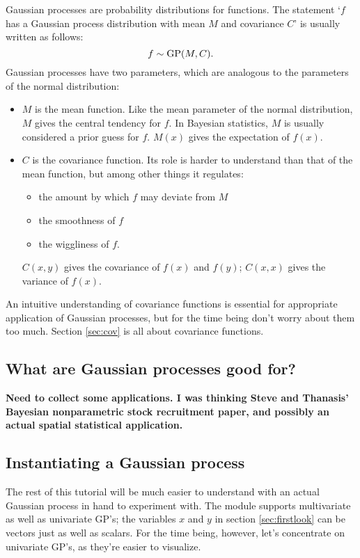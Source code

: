 \documentclass{manual}
\begin{document}
Gaussian processes are probability distributions for functions. The statement `$f$ has a Gaussian process distribution with mean $M$ and covariance $C$' is usually written as follows:
\begin{equation}
    f\sim\textup{GP}(M,C).
\end{equation}
Gaussian processes have two parameters, which are analogous to the parameters of the normal distribution:
\begin{itemize}
    \item $M$ is the mean function. Like the mean parameter of the normal distribution, $M$ gives the central tendency for $f$. In Bayesian statistics, $M$ is usually considered a prior guess for $f$. $M(x)$ gives the expectation of $f(x)$.
    \item $C$  is the covariance function. Its role is harder to understand than that of the mean function, but among other things it regulates:
    \begin{itemize}
        \item the amount by which $f$ may deviate from $M$
        \item the smoothness of $f$
        \item the wiggliness of $f$.
    \end{itemize}
    $C(x,y)$ gives the covariance of $f(x)$ and $f(y)$; $C(x,x)$ gives the variance of $f(x)$.
\end{itemize}
An intuitive understanding of covariance functions is essential for appropriate application of Gaussian processes, but for the time being don't worry about them too much. Section \ref{sec:cov} is all about covariance functions.


\subsection{What are Gaussian processes good for?}\label{sub:applications}
\textbf{Need to collect some applications. I was thinking Steve and Thanasis' Bayesian nonparametric stock recruitment paper, and possibly an actual spatial statistical application.}

\subsection{Instantiating a Gaussian process}\label{sub:inst}

The rest of this tutorial will be much easier to understand with an actual Gaussian process in hand to experiment with. The  module supports multivariate as well as univariate GP's; the variables $x$ and $y$ in section \ref{sec:firstlook} can be vectors just as well as scalars. For the time being, however, let's concentrate on univariate GP's, as they're easier to visualize.
\end{document}

